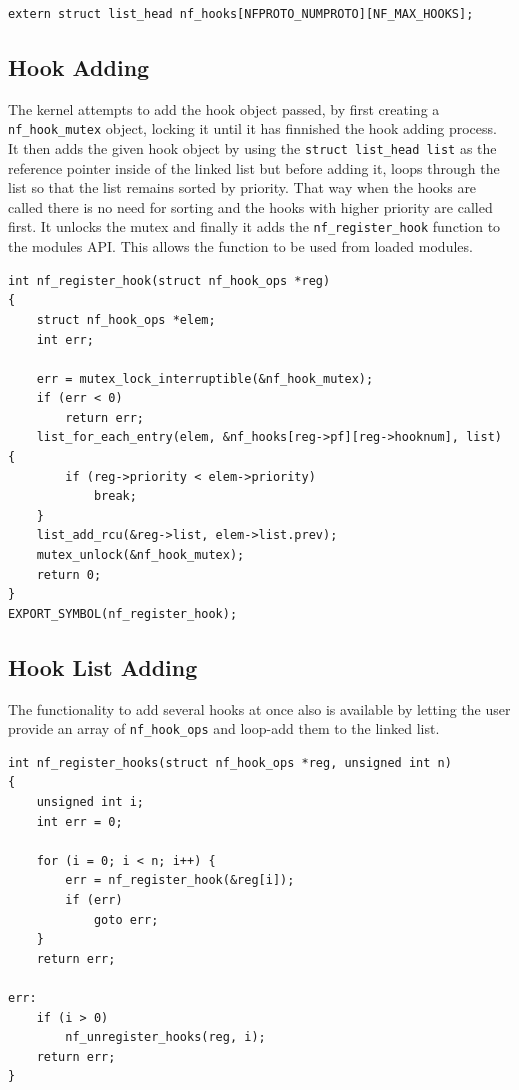 \begin{lstlisting}
extern struct list_head nf_hooks[NFPROTO_NUMPROTO][NF_MAX_HOOKS];
\end{lstlisting}

\subsection{Hook Adding}\label{hook_add}
The kernel attempts to add the hook object passed, by first creating a \verb|nf_hook_mutex| object, locking it until it has finnished the hook adding process. It then adds the given hook object by using the \verb|struct list_head list| as the reference pointer inside of the linked list but before adding it, loops through the list so that the list remains sorted by priority. That way when the hooks are called there is no need for sorting and the hooks with higher priority are called first. It unlocks the mutex and finally it adds the \verb|nf_register_hook| function to the modules API. This allows the function to be used from loaded modules. 

\begin{lstlisting}
int nf_register_hook(struct nf_hook_ops *reg)
{
	struct nf_hook_ops *elem;
	int err;

	err = mutex_lock_interruptible(&nf_hook_mutex);
	if (err < 0)
		return err;
	list_for_each_entry(elem, &nf_hooks[reg->pf][reg->hooknum], list) {
		if (reg->priority < elem->priority)
			break;
	}
	list_add_rcu(&reg->list, elem->list.prev);
	mutex_unlock(&nf_hook_mutex);
	return 0;
}
EXPORT_SYMBOL(nf_register_hook);
\end{lstlisting}

\subsection{Hook List Adding}\label{hook_list_adding}
The functionality to add several hooks at once also is available by letting the user provide an array of \verb|nf_hook_ops| and loop-add them to the linked list.

\begin{lstlisting}
int nf_register_hooks(struct nf_hook_ops *reg, unsigned int n)
{
	unsigned int i;
	int err = 0;

	for (i = 0; i < n; i++) {
		err = nf_register_hook(&reg[i]);
		if (err)
			goto err;
	}
	return err;

err:
	if (i > 0)
		nf_unregister_hooks(reg, i);
	return err;
}
\end{lstlisting}

